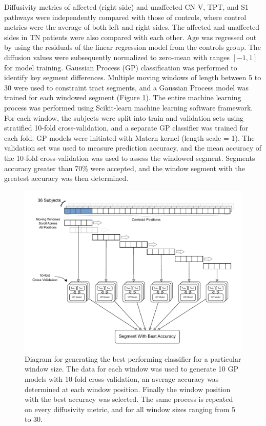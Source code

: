 Diffusivity metrics of affected (right side) and unaffected CN V, TPT, and S1 pathways were independently compared with those of controls, where control metrics were the average of both left and right sides. The affected and unaffected sides in TN patients were also compared with each other. 
Age was regressed out by using the residuals of the linear regression model from the controls group. The diffusion values were subsequently normalized to zero-mean with ranges $[-1, 1]$ for model training. 
Gaussian Process (GP) classification was performed to identify key segment differences. Multiple moving windows of length between 5 to 30 were used to constraint tract segments, and a Gaussian Process model was trained for each windowed segment (Figure \ref{fig:GPfigure-gp-train}). The entire machine learning process was performed using Scikit-learn machine learning software framework.
For each window, the subjects were split into train and validation sets using stratified 10-fold cross-validation, and a separate GP classifier was trained for each fold. GP models were initiated with Matern kernel (length scale = 1). The validation set was used to measure prediction accuracy, and the mean accuracy of the 10-fold cross-validation was used to assess the windowed segment. Segments accuracy greater than 70\% were accepted, and the window segment with the greatest accuracy was then determined. 

\begin{figure}[ht]
\centering
\includegraphics[width=\linewidth]{thesis/images/tn-gp-sagit/figure-GP-training.pdf}
\caption{Diagram for generating the best performing classifier for a particular window size. The data for each window was used to generate 10 GP models with 10-fold cross-validation, an average accuracy was determined at each window position. Finally the window position with the best accuracy was selected. The same process is repeated on every diffusivity metric, and for all window sizes ranging from 5 to 30. }
\label{fig:GPfigure-gp-train}
\end{figure}

